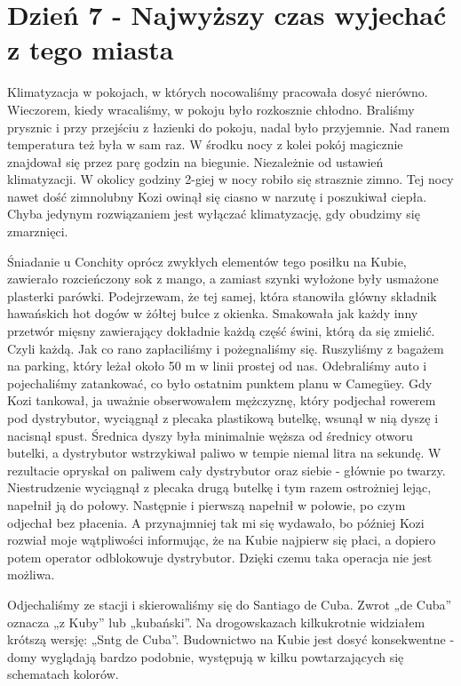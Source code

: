 
\chapter[Najwyższy czas wyjechać z tego miasta]{Dzień 7 - Najwyższy czas wyjechać z tego miasta}

Klimatyzacja w pokojach, w których nocowaliśmy pracowała dosyć nierówno.
Wieczorem, kiedy wracaliśmy, w pokoju było rozkosznie chłodno.
Braliśmy prysznic i przy przejściu z łazienki do pokoju, nadal było przyjemnie.
Nad ranem temperatura też była w sam raz.
W środku nocy z kolei pokój magicznie znajdował się przez parę godzin na biegunie.
Niezależnie od ustawień klimatyzacji.
W okolicy godziny 2-giej w nocy robiło się strasznie zimno.
Tej nocy nawet dość zimnolubny Kozi owinął się ciasno w narzutę i poszukiwał ciepła.
Chyba jedynym rozwiązaniem jest wyłączać klimatyzację, gdy obudzimy się zmarznięci.
\par Śniadanie u Conchity oprócz zwykłych elementów tego posiłku na Kubie, zawierało rozcieńczony sok z mango, a zamiast szynki wyłożone były usmażone plasterki parówki.
Podejrzewam, że tej samej, która stanowiła główny składnik hawańskich hot dogów w żółtej bułce z okienka.
Smakowała jak każdy inny przetwór mięsny zawierający dokładnie każdą część świni, którą da się zmielić.
Czyli każdą.
Jak co rano zapłaciliśmy i pożegnaliśmy się.
Ruszyliśmy z bagażem na parking, który leżał około 50 m w linii prostej od nas.
Odebraliśmy auto i pojechaliśmy zatankować, co było ostatnim punktem planu w Camegüey.
Gdy Kozi tankował, ja uważnie obserwowałem mężczyznę, który podjechał rowerem pod dystrybutor, wyciągnął z plecaka plastikową butelkę, wsunął w nią dyszę i nacisnął spust.
Średnica dyszy była minimalnie węższa od średnicy otworu butelki, a dystrybutor wstrzykiwał paliwo w tempie niemal litra na sekundę.
W rezultacie opryskał on paliwem cały dystrybutor oraz siebie - głównie po twarzy.
Niestrudzenie wyciągnął z plecaka drugą butelkę i tym razem ostrożniej lejąc, napełnił ją do połowy.
Następnie i pierwszą napełnił w połowie, po czym odjechał bez płacenia.
A przynajmniej tak mi się wydawało, bo później Kozi rozwiał moje wątpliwości informując, że na Kubie najpierw się płaci, a dopiero potem operator odblokowuje dystrybutor.
Dzięki czemu taka operacja nie jest możliwa.
\par Odjechaliśmy ze stacji i skierowaliśmy się do Santiago de Cuba.
Zwrot „de Cuba” oznacza „z Kuby” lub „kubański”.
Na drogowskazach kilkukrotnie widziałem krótszą wersję: „Sntg de Cuba”.
Budownictwo na Kubie jest dosyć konsekwentne - domy wyglądają bardzo podobnie, występują w kilku powtarzających się schematach kolorów.
